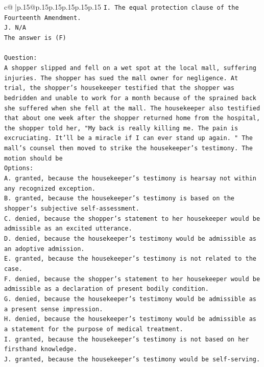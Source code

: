 \documentclass{article}
\begin{document}
{\begin{supertabular}{c@{$\;$}|p{.15\linewidth}@{}p{.15\linewidth}p{.15\linewidth}p{.15\linewidth}p{.15\linewidth}p{.15\linewidth}}
{{{\texttt{I. The equal protection clause of the Fourteenth Amendment.} \\
\texttt{J. N/A} \\
\texttt{The answer is (F)} \\
\\ 
\texttt{Question:} \\
\texttt{A shopper slipped and fell on a wet spot at the local mall, suffering injuries. The shopper has sued the mall owner for negligence. At trial, the shopper's housekeeper testified that the shopper was bedridden and unable to work for a month because of the sprained back she suffered when she fell at the mall. The housekeeper also testified that about one week after the shopper returned home from the hospital, the shopper told her, "My back is really killing me. The pain is excruciating. It'll be a miracle if I can ever stand up again. " The mall's counsel then moved to strike the housekeeper's testimony. The motion should be} \\
\texttt{Options:} \\
\texttt{A. granted, because the housekeeper's testimony is hearsay not within any recognized exception.} \\
\texttt{B. granted, because the housekeeper's testimony is based on the shopper's subjective self{-}assessment.} \\
\texttt{C. denied, because the shopper's statement to her housekeeper would be admissible as an excited utterance.} \\
\texttt{D. denied, because the housekeeper's testimony would be admissible as an adoptive admission.} \\
\texttt{E. granted, because the housekeeper's testimony is not related to the case.} \\
\texttt{F. denied, because the shopper's statement to her housekeeper would be admissible as a declaration of present bodily condition.} \\
\texttt{G. denied, because the housekeeper's testimony would be admissible as a present sense impression.} \\
\texttt{H. denied, because the housekeeper's testimony would be admissible as a statement for the purpose of medical treatment.} \\
\texttt{I. granted, because the housekeeper's testimony is not based on her firsthand knowledge.} \\
\texttt{J. granted, because the housekeeper's testimony would be self{-}serving.} \\
            }
        }
    }
     \\ \\


\end{supertabular}}
\end{document}
